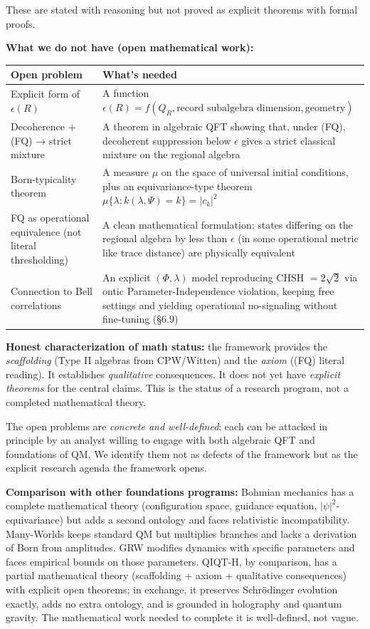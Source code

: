 \documentclass[11pt,a4paper]{article}
\begin{document}
These are stated with reasoning but not proved as explicit theorems with formal proofs.

\textbf{What we do not have (open mathematical work):}

\begin{center}
\small
\begin{tabularx}{\linewidth}{|Y|Y|}
\hline
\textbf{Open problem} & \textbf{What's needed} \\
\hline
Explicit form of $\epsilon(R)$ & A function $\epsilon(R) = f(Q_R, \text{record subalgebra dimension}, \text{geometry})$ \\
\hline
Decoherence + (FQ) → strict mixture & A theorem in algebraic QFT showing that, under (FQ), decoherent suppression below $\epsilon$ gives a strict classical mixture on the regional algebra \\
\hline
Born-typicality theorem & A measure $\mu$ on the space of universal initial conditions, plus an equivariance-type theorem $\mu\{\lambda : k(\lambda, \Psi) = k\} = \vert c_k\vert ^2$ \\
\hline
FQ as operational equivalence (not literal thresholding) & A clean mathematical formulation: states differing on the regional algebra by less than $\epsilon$ (in some operational metric like trace distance) are physically equivalent \\
\hline
Connection to Bell correlations & An explicit $(\Phi,\lambda)$ model reproducing CHSH $=2\sqrt2$ via ontic Parameter-Independence violation, keeping free settings and yielding operational no-signaling without fine-tuning (§6.9) \\
\hline
\end{tabularx}
\end{center}

\textbf{Honest characterization of math status:} the framework provides the \emph{scaffolding} (Type II algebras from CPW/Witten) and the \emph{axiom} ((FQ) literal reading). It establishes \emph{qualitative} consequences. It does not yet have \emph{explicit theorems} for the central claims. This is the status of a research program, not a completed mathematical theory.

The open problems are \emph{concrete and well-defined}: each can be attacked in principle by an analyst willing to engage with both algebraic QFT and foundations of QM. We identify them not as defects of the framework but as the explicit research agenda the framework opens.

\textbf{Comparison with other foundations programs:} Bohmian mechanics has a complete mathematical theory (configuration space, guidance equation, $|\psi|^2$-equivariance) but adds a second ontology and faces relativistic incompatibility. Many-Worlds keeps standard QM but multiplies branches and lacks a derivation of Born from amplitudes. GRW modifies dynamics with specific parameters and faces empirical bounds on those parameters. QIQT-H, by comparison, has a partial mathematical theory (scaffolding + axiom + qualitative consequences) with explicit open theorems; in exchange, it preserves Schrödinger evolution exactly, adds no extra ontology, and is grounded in holography and quantum gravity. The mathematical work needed to complete it is well-defined, not vague.
\end{document}
